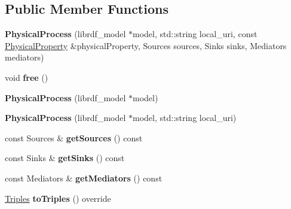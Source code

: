 \subsection*{Public Member Functions}
\begin{DoxyCompactItemize}
\item 
\mbox{\label{classomexmeta_1_1PhysicalProcess_a314ea401be51fc50f2e1f47c5cb3cd46}} 
{\bfseries Physical\+Process} (librdf\+\_\+model $\ast$model, std\+::string local\+\_\+uri, const \hyperlink{classomexmeta_1_1PhysicalProperty}{Physical\+Property} \&physical\+Property, Sources sources, Sinks sinks, Mediators mediators)
\item 
\mbox{\label{classomexmeta_1_1PhysicalProcess_a8dfcffe80f264ad24e70de9d7b71c73b}} 
void {\bfseries free} ()
\item 
\mbox{\label{classomexmeta_1_1PhysicalProcess_a2b694395a318335e81c884ed76b5f4dd}} 
{\bfseries Physical\+Process} (librdf\+\_\+model $\ast$model)
\item 
\mbox{\label{classomexmeta_1_1PhysicalProcess_a5d693bbee74d363b718f259c983ca7e1}} 
{\bfseries Physical\+Process} (librdf\+\_\+model $\ast$model, std\+::string local\+\_\+uri)
\item 
\mbox{\label{classomexmeta_1_1PhysicalProcess_ab5f3100febc21173775a2090bb57a0fb}} 
const Sources \& {\bfseries get\+Sources} () const
\item 
\mbox{\label{classomexmeta_1_1PhysicalProcess_a069e7caa05f346f90f413f650f081535}} 
const Sinks \& {\bfseries get\+Sinks} () const
\item 
\mbox{\label{classomexmeta_1_1PhysicalProcess_a349b76ad1831d2510904510583f0d7f2}} 
const Mediators \& {\bfseries get\+Mediators} () const
\item 
\mbox{\label{classomexmeta_1_1PhysicalProcess_ab6f6af00fac2401f9a88e186fd1d897a}} 
\hyperlink{classomexmeta_1_1Triples}{Triples} {\bfseries to\+Triples} () override
\item 

\end{DoxyCompactItemize}
